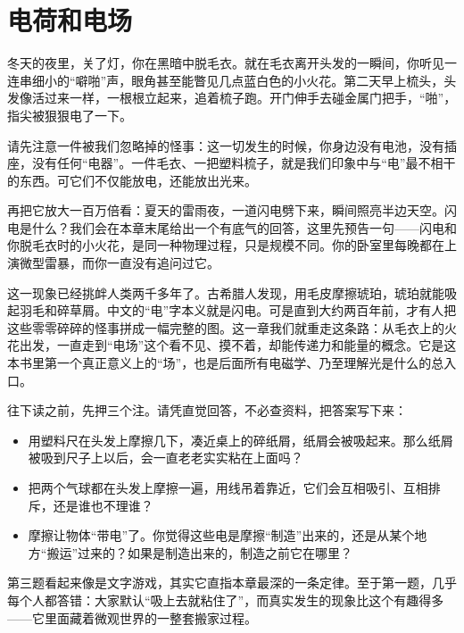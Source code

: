 \chapter{电荷和电场}


\begin{mainline}
冬天的夜里，关了灯，你在黑暗中脱毛衣。就在毛衣离开头发的一瞬间，你听见一连串细小的“噼啪”声，眼角甚至能瞥见几点蓝白色的小火花。第二天早上梳头，头发像活过来一样，一根根立起来，追着梳子跑。开门伸手去碰金属门把手，“啪”，指尖被狠狠电了一下。

请先注意一件被我们忽略掉的怪事：这一切发生的时候，你身边没有电池，没有插座，没有任何“电器”。一件毛衣、一把塑料梳子，就是我们印象中与“电”最不相干的东西。可它们不仅能放电，还能放出光来。

再把它放大一百万倍看：夏天的雷雨夜，一道闪电劈下来，瞬间照亮半边天空。闪电是什么？我们会在本章末尾给出一个有底气的回答，这里先预告一句——闪电和你脱毛衣时的小火花，是同一种物理过程，只是规模不同。你的卧室里每晚都在上演微型雷暴，而你一直没有追问过它。

这一现象已经挑衅人类两千多年了。古希腊人发现，用毛皮摩擦琥珀，琥珀就能吸起羽毛和碎草屑。中文的“电”字本义就是闪电。可是直到大约两百年前，才有人把这些零零碎碎的怪事拼成一幅完整的图。这一章我们就重走这条路：从毛衣上的火花出发，一直走到“电场”这个看不见、摸不着，却能传递力和能量的概念。它是这本书里第一个真正意义上的“场”，也是后面所有电磁学、乃至理解光是什么的总入口。
\end{mainline}


\begin{mainline}
往下读之前，先押三个注。请凭直觉回答，不必查资料，把答案写下来：

\begin{itemize}
  \item 用塑料尺在头发上摩擦几下，凑近桌上的碎纸屑，纸屑会被吸起来。那么纸屑被吸到尺子上以后，会一直老老实实粘在上面吗？
  \item 把两个气球都在头发上摩擦一遍，用线吊着靠近，它们会互相吸引、互相排斥，还是谁也不理谁？
  \item 摩擦让物体“带电”了。你觉得这些电是摩擦“制造”出来的，还是从某个地方“搬运”过来的？如果是制造出来的，制造之前它在哪里？
\end{itemize}

第三题看起来像是文字游戏，其实它直指本章最深的一条定律。至于第一题，几乎每个人都答错：大家默认“吸上去就粘住了”，而真实发生的现象比这个有趣得多——它里面藏着微观世界的一整套搬家过程。
\end{mainline}

